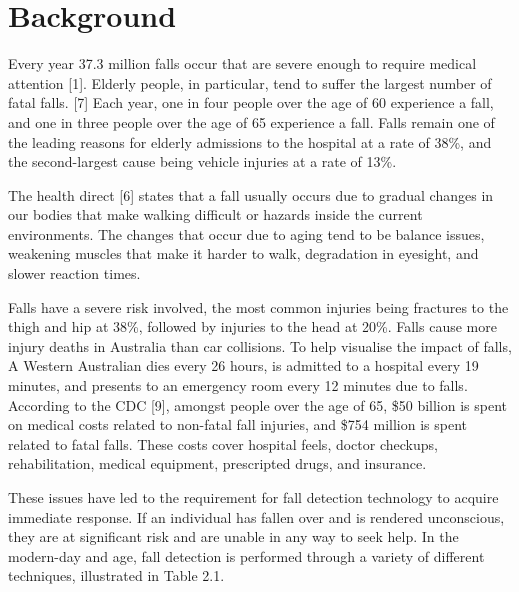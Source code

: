 
 \chapter{Background}\label{ch:background}
Every year 37.3 million falls occur that are severe enough to require medical attention [1]. Elderly people, in particular, tend to suffer the largest number of fatal falls. [7] Each year, one in four people over the age of 60 experience a fall, and one in three people over the age of 65 experience a fall. Falls remain one of the leading reasons for elderly admissions to the hospital at a rate of 38\%, and the second-largest cause being vehicle injuries at a rate of 13\%.

The health direct [6] states that a fall usually occurs due to gradual changes in our bodies that make walking difficult or hazards inside the current environments. The changes that occur due to aging tend to be balance issues, weakening muscles that make it harder to walk, degradation in eyesight, and slower reaction times. 

Falls have a severe risk involved, the most common injuries being fractures to the thigh and hip at 38\%, followed by injuries to the head at 20\%. Falls cause more injury deaths in Australia than car collisions. To help visualise the impact of falls, A Western Australian dies every 26 hours, is admitted to a hospital every 19 minutes, and presents to an emergency room every 12 minutes due to falls. According to the CDC [9], amongst people over the age of 65, \$50 billion is spent on medical costs related to non-fatal fall injuries, and \$754 million is spent related to fatal falls. These costs cover hospital feels, doctor checkups, rehabilitation, medical equipment, prescripted drugs, and insurance.

These issues have led to the requirement for fall detection technology to acquire immediate response. If an individual has fallen over and is rendered unconscious, they are at significant risk and are unable in any way to seek help. In the modern-day and age, fall detection is performed through a variety of different techniques, illustrated in Table 2.1.\\



